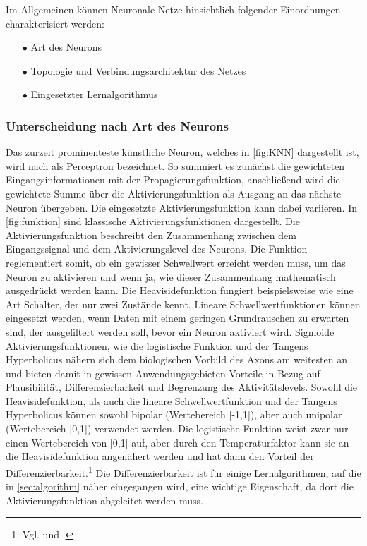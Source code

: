 Im Allgemeinen können Neuronale Netze hinsichtlich folgender Einordnungen charakterisiert werden:\,
\begin{itemize}
\item[\textbf{$\bullet$}] Art des Neurons

\item[\textbf{$\bullet$}] Topologie und Verbindungsarchitektur des Netzes

\item[\textbf{$\bullet$}] Eingesetzter Lernalgorithmus
\end{itemize}

\subsubsection{Unterscheidung nach Art des Neurons}

Das zurzeit prominenteste künstliche Neuron, welches in \autoref{fig:KNN} dargestellt ist, wird nach \citet{perceptron_ros58} als Perceptron bezeichnet. So summiert es zunächst die gewichteten Eingangsinformationen mit der Propagierungsfunktion, anschließend wird die gewichtete Summe über die Aktivierungsfunktion als Ausgang an das nächste Neuron übergeben. Die eingesetzte Aktivierungsfunktion kann dabei variieren. In \autoref{fig:funktion} sind klassische Aktivierungsfunktionen dargestellt. Die Aktivierungsfunktion beschreibt den Zusammenhang zwischen dem Eingangssignal und dem Aktivierungslevel des Neurons. Die Funktion reglementiert somit, ob ein gewisser Schwellwert erreicht werden muss, um das Neuron zu aktivieren und wenn ja, wie dieser Zusammenhang mathematisch ausgedrückt werden kann. Die Heavisidefunktion fungiert beispielsweise wie eine Art Schalter, der nur zwei Zustände kennt. Lineare Schwellwertfunktionen können eingesetzt werden, wenn Daten mit einem geringen Grundrauschen zu erwarten sind, der ausgefiltert werden soll, bevor ein Neuron aktiviert wird. Sigmoide Aktivierungsfunktionen, wie die logistische Funktion und der Tangens Hyperbolicus nähern sich dem biologischen Vorbild des Axons am weitesten an und bieten damit in gewissen Anwendungsgebieten Vorteile in Bezug auf Plausibilität, Differenzierbarkeit und Begrenzung des Aktivitätslevels. Sowohl die Heavisidefunktion, als auch die lineare Schwellwertfunktion und der Tangens Hyperbolicus können sowohl bipolar (Wertebereich [-1,1]), aber auch unipolar (Wertebereich [0,1]) verwendet werden. Die logistische Funktion weist zwar nur einen Wertebereich von [0,1] auf, aber durch den Temperaturfaktor kann sie an die Heavisidefunktion angenähert werden und hat dann den Vorteil der Differenzierbarkeit.\footnote{Vgl. \citet[5]{neuralnet_intro} und \citet[39 f]{dkriesel07}.} Die Differenzierbarkeit ist für einige Lernalgorithmen, auf die in \autoref{sec:algorithm} näher eingegangen wird, eine wichtige Eigenschaft, da dort die Aktivierungsfunktion abgeleitet werden muss.

